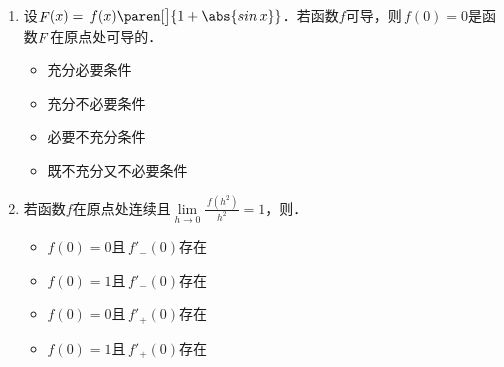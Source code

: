 \documentclass[a4paper,punct=CCT]{ctexbook}
\makeatletter
\theoremstyle{definition}
\theoremstyle{remark}
\newif\ifshowsol
\renewcommand*{\proofname}{证}
\renewenvironment{proof}[1][\proofname]{\par
  \pushQED{\qed}%
  \normalfont \topsep6\p@\@plus6\p@\relax
  \trivlist
  \item[\hskip\labelsep
    \bfseries
    #1%
    ]\ignorespaces
}{%
  \popQED\endtrivlist\@endpefalse
}
\makeatother
\begin{document}
\begin{enumerate}
\item 设\(\Fn F(x) = \,f(x) \paren[\big]{1+\abs{\sin x}}\)．若函数\(f\)可导，则\(\,f(0) = 0\)是函数\(\mathop{\relax F}\nolimits\)在原点处可导的\uline{\hfill}．
  \begin{itemize}
    \renewcommand{\labelitemi}{\faCircleThin}
    \ifshowsol
  \item[\faCircle]
    \else
  \item
    \fi
    充分必要条件
  \item 充分不必要条件
  \item 必要不充分条件
  \item 既不充分又不必要条件
  \end{itemize}

  \ifshowsol
  \begin{proof}
    注意到\(\Fn F(0) = \,f(0)\)．有
    \begin{equation}
      \begin{split}
        \Fn F'(0)
        &= \lim_{\fdx\to0} \frac{\fwdf F(0)}{\fdx}
        = \lim_{\fdx\to0} \frac{\,f(\fdx)\paren[\big]{1+\abs{\sin\fdx}} - f(0)}{\fdx} \\
        &= \lim_{\fdx\to0} \paren[\bigg]{
          \frac{\,f(\fdx) - f(0)}{\fdx}
          + f(\fdx) \frac{\abs{\sin\fdx}}{\fdx}}.
      \end{split}
      \label{eq:B1.4.1.E7}
    \end{equation}
    假设\(f(0) = 0\)．因为函数\(f\)可导，所以连续，即\(\lim_{\fdx\to0} \,f(\fdx) = f(0) = 0\)．式~\eqref{eq:B1.4.1.E7}就变成\(F'(0) = f'(0)\)．充分性得证．假设\(f(0) \ne 0\)．那么式~\eqref{eq:B1.4.1.E7}中的\(\fdx\)从左右两个方向趋向于零，就会得到不相等的左右极限，即函数\(F\)在原点处不可导．必要性得证．
  \end{proof}
  \fi

\item 若函数\(f\)在原点处连续且\(\lim\limits_{h\to0} \frac{\,f(h^2)}{h^2} = 1\)，则\uline{\hspace{8em}}．
  \begin{itemize}
    \renewcommand{\labelitemi}{\faCircleThin}
  \item \(f(0) = 0\)且\(\,f'_-(0)\)存在
  \item \(f(0) = 1\)且\(\,f'_-(0)\)存在
    \ifshowsol
  \item[\faCircle]
    \else
  \item
    \fi
    \(f(0) = 0\)且\(\,f'_+(0)\)存在
  \item \(f(0) = 1\)且\(\,f'_+(0)\)存在
  \end{itemize}


\end{enumerate}
\end{document}
